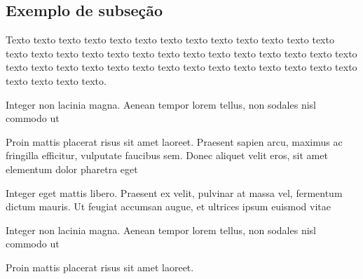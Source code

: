 
\subsection{Exemplo de subseção} \label{sec:ex_sec}
	
    Texto texto texto texto texto texto texto texto texto texto texto texto texto texto texto texto texto texto texto texto texto texto texto texto texto texto texto texto texto texto texto texto texto texto texto texto texto texto texto texto texto texto texto texto texto.



    \begin{alineascomponto}
	    \item Integer non lacinia magna. Aenean tempor lorem tellus, non sodales nisl commodo ut
	    \item Proin mattis placerat risus sit amet laoreet. Praesent sapien arcu, maximus ac fringilla efficitur, vulputate faucibus sem. Donec aliquet velit eros, sit amet elementum dolor pharetra eget
	    \item Integer eget mattis libero. Praesent ex velit, pulvinar at massa vel, fermentum dictum mauris. Ut feugiat accumsan augue, et ultrices ipsum euismod vitae
	    \begin{subalineascomponto}
		    \item Integer non lacinia magna. Aenean tempor lorem tellus, non sodales nisl commodo ut
		    \item Proin mattis placerat risus sit amet laoreet.
	    \end{subalineascomponto}
    \end{alineascomponto}

